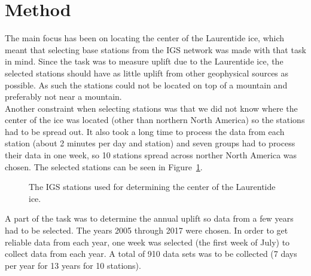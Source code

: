 \documentclass[12pt,a4paper]{article}
\begin{document}
\section{Method}
The main focus has been on locating the center of the Laurentide ice, which meant that selecting base stations from the IGS network was made with that task in mind.
Since the task was to measure uplift due to the Laurentide ice, the selected stations should have as little uplift from other geophysical sources as possible.
As such the stations could not be located on top of a mountain and preferably not near a mountain.\\
Another constraint when selecting stations was that we did not know where the center of the ice was located (other than northern North America) so the stations had to be spread out.
It also took a long time to process the data from each station (about 2 minutes per day and station) and seven groups had to process their data in one week, so 10 stations spread across norther North America was chosen.
The selected stations can be seen in Figure~\ref{fig:stations}.
\begin{figure}[!ht]
  \centering
  \noindent{}
  \caption{The IGS stations used for determining the center of the Laurentide ice.}
  \label{fig:stations}
\end{figure}

A part of the task was to determine the annual uplift so data from a few years had to be selected.
The years 2005 through 2017 were chosen.
In order to get reliable data from each year, one week was selected (the first week of July) to collect data from each year.
A total of 910 data sets was to be collected (7 days per year for 13 years for 10 stations).
\end{document}

